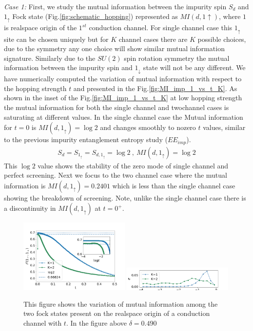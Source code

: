 \documentclass[reprint,prb,superscriptaddress]{revtex4-2}
\begin{document}
\par \textit{Case 1:} First, we study the mutual information between the impurity spin $S_d$ and $1_\uparrow$ Fock state (Fig.\ref{fig:schematic_hopping}) represented as $MI(d,1\uparrow)$, where $1$ is realspace origin of the $1^{st}$ conduction channel. For single channel case this $1_{\uparrow}$ site can be chosen uniquely but for $K$ channel cases there are $K$ possible choices, due to the symmetry any one choice will show similar mutual information signature. Similarly due to the $SU(2)$ spin rotation symmetry the mutual information between the impurity spin and $1_{\downarrow}$ state will not be any different. We have numerically computed the variation of mutual information with respect to the hopping strength $t$ and presented in the Fig.\ref{fig:MI_imp_1_vs_t_K}.  As shown in the inset of the Fig.\ref{fig:MI_imp_1_vs_t_K} at low hopping strength the mutual information for both the single channel and twochannel cases is saturating at different values. In the single channel case the Mutual information for $t=0$ is $MI(d,1_{\uparrow})=\log 2$ and changes smoothly to nozero $t$ values, similar to the previous impurity entanglement entropy study ($EE_{imp}$).
\begin{eqnarray}
S_{d}=S_{1_{\uparrow}}=S_{d,1_{\uparrow}}=\log 2~,~MI(d,1_{\uparrow})=\log 2
\end{eqnarray}
This $\log 2$ value shows the stability of the zero mode of single channel and perfect screening. Next we focus to the two channel case where the mutual information is $MI(d,1_{\uparrow})=0.2401$ which is less than the single channel case showing the breakdown of screening. Note, unlike the single channel case there is a discontinuity in $MI(d,1_{\uparrow})$ at $t=0^+$.



\begin{figure}[!htpb]
\includegraphics[width=0.49\textwidth]{plt/A_I2_ch12_['1_up','1_down']}
\includegraphics[width=0.49\textwidth]{plt/errorbar_A_I2_ch12_['1_up','1_down']}

\caption{This figure shows the variation of mutual information among the two fock states present on the realspace origin of a conduction channel with $t$. In the figure above $\delta=0.490$}
\label{fig:MI_1_2_vs_t_K}
\end{figure}
\end{document}

